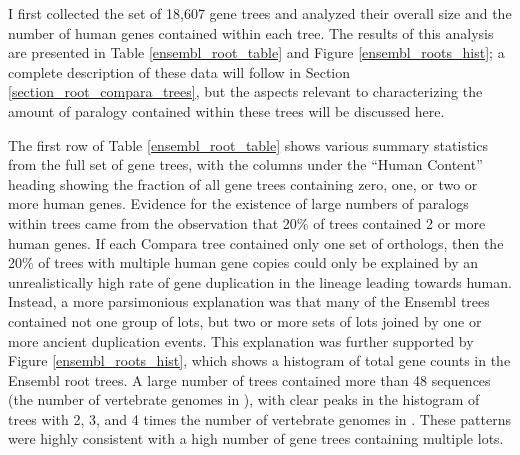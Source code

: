 I first collected the set of 18,607 \cmp gene trees and analyzed their
overall size and the number of human genes contained within each
tree. The results of this analysis are presented in Table
\ref{ensembl_root_table} and Figure \ref{ensembl_roots_hist}; a
complete description of these data will follow in Section
\ref{section_root_compara_trees}, but the aspects relevant to
characterizing the amount of paralogy contained within these trees
will be discussed here.

The first row of Table \ref{ensembl_root_table} shows various summary
statistics from the full set of \cmp gene trees, with the columns
under the ``Human Content'' heading showing the fraction of all gene
trees containing zero, one, or two or more human genes. Evidence for
the existence of large numbers of paralogs within \cmp trees came from
the observation that 20\% of \cmp trees contained 2 or more human
genes. If each Compara tree contained only one set of \mammln
orthologs, then the 20\% of trees with multiple human gene copies
could only be explained by an unrealistically high rate of gene
duplication in the lineage leading towards human. Instead, a more
parsimonious explanation was that many of the Ensembl trees contained
not one group of \mammln \acp{lot}, but two or more sets of \mammln
\acp{lot} joined by one or more ancient duplication events. This
explanation was further supported by Figure \ref{ensembl_roots_hist},
which shows a histogram of total gene counts in the Ensembl root
trees. A large number of trees contained more than 48 sequences (the
number of vertebrate genomes in \ens), with clear peaks in the
histogram of trees with 2, 3, and 4 times the number of vertebrate
genomes in \ens. These patterns were highly consistent with a high
number of \cmp gene trees containing multiple \mammln \acp{lot}.

